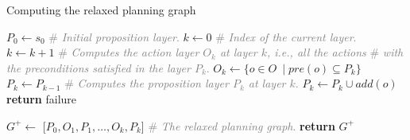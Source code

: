 \documentclass[ppgc,diss,english]{iiufrgs}
\begin{document}
\begin{algorithm}[tb]
\caption{Computing the relaxed planning graph}
\label{alg:computing-rpg}
\begin{algorithmic}[1]
  \State $P_{0} \gets s_{0}$ \textcolor{gray}{\# \emph{Initial proposition layer}.}
  \State $k \gets 0$ \textcolor{gray}{\# \emph{Index of the current layer}.}
    \State $k \gets k + 1$
    \State \textcolor{gray}{\# \emph{Computes the action layer $O_{k}$ at layer $k$, i.e., all the actions}}
    \State \textcolor{gray}{\# \emph{with the preconditions satisfied in the layer $P_{k}$}.}
    \State $O_{k} \gets \{o \in O\ \mid pre(o) \subseteq P_{k}\}$
    \State $P_{k} \gets P_{k-1}$
      \State \textcolor{gray}{\# \emph{Computes the proposition layer $P_{k}$ at layer $k$}.}
      \State $P_{k} \gets P_{k} \cup add(o)$
    \EndFor
      \State \textbf{return} failure
    \EndIf

  \EndWhile

  \State $G^{+} \gets $ [$P_{0}, O_{1}, P_{1},\ldots,O_{k}, P_{k}$] \textcolor{gray}{\# \emph{The relaxed planning graph}.}
  \State \textbf{return} $G^{+}$
\EndProcedure
\end{algorithmic}
\end{algorithm}
\end{document}
